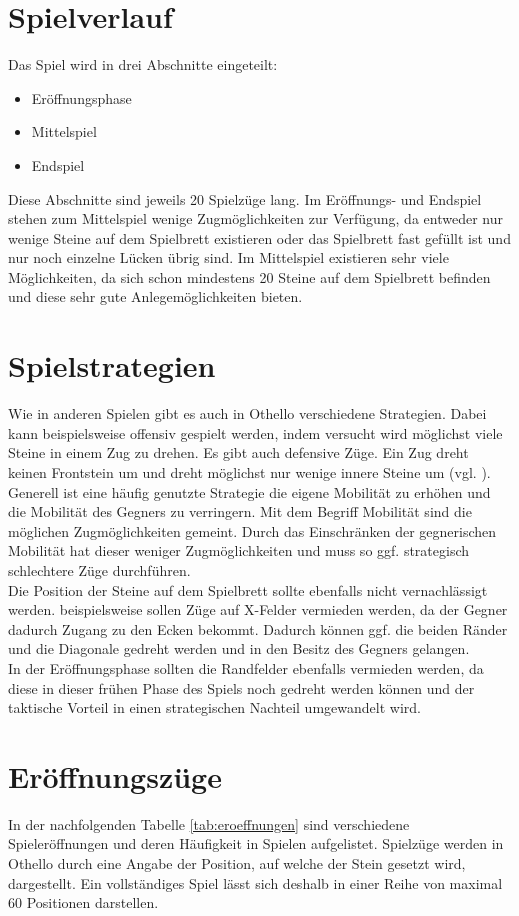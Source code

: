 \section{Spielverlauf}
Das Spiel wird in drei Abschnitte eingeteilt:
\begin{itemize}
\item Eröffnungsphase
\item Mittelspiel
\item Endspiel
\end{itemize}
Diese Abschnitte sind jeweils 20 Spielzüge lang.
Im Eröffnungs- und Endspiel stehen zum Mittelspiel wenige Zugmöglichkeiten zur Verfügung, da entweder nur wenige Steine auf dem Spielbrett existieren oder das Spielbrett fast gefüllt ist und nur noch einzelne Lücken übrig sind. Im Mittelspiel existieren sehr viele Möglichkeiten, da sich schon mindestens 20 Steine auf dem Spielbrett befinden und diese sehr gute Anlegemöglichkeiten bieten. 
\section{Spielstrategien}
Wie in anderen Spielen gibt es auch in Othello verschiedene Strategien. Dabei kann beispielsweise offensiv gespielt werden, indem versucht wird möglichst viele Steine in einem Zug zu drehen. Es gibt auch defensive  Züge. Ein  Zug dreht keinen Frontstein um und dreht möglichst nur wenige innere Steine um (vgl. \cite{Ortiz.}).
\\ Generell ist eine häufig genutzte Strategie die eigene Mobilität zu erhöhen und die Mobilität des Gegners zu verringern. Mit dem Begriff Mobilität sind die möglichen Zugmöglichkeiten gemeint. Durch das Einschränken der gegnerischen Mobilität hat dieser weniger Zugmöglichkeiten und muss so ggf. strategisch schlechtere Züge durchführen.
\\Die Position der Steine auf dem Spielbrett sollte ebenfalls nicht vernachlässigt werden.
beispielsweise sollen Züge auf X-Felder vermieden werden, da der Gegner dadurch Zugang zu den Ecken bekommt. Dadurch können ggf. die beiden Ränder und die Diagonale gedreht werden und in den Besitz des Gegners gelangen.
\\In der Eröffnungsphase sollten die Randfelder ebenfalls vermieden werden, da diese in dieser frühen Phase des Spiels noch gedreht werden können und der taktische Vorteil in einen strategischen Nachteil umgewandelt wird.
\section{Eröffnungszüge}
\label{othello-eroff}
In der nachfolgenden Tabelle \ref{tab:eroeffnungen} sind verschiedene Spieleröffnungen und deren Häufigkeit in Spielen aufgelistet. Spielzüge werden in Othello durch eine Angabe der Position, auf welche der Stein gesetzt wird, dargestellt. Ein vollständiges Spiel lässt sich deshalb in einer Reihe von maximal 60 Positionen darstellen.

